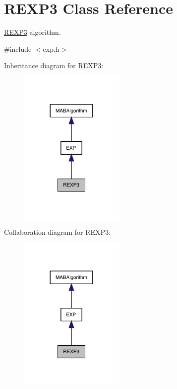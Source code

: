 \hypertarget{class_r_e_x_p3}{}\section{R\+E\+X\+P3 Class Reference}
\label{class_r_e_x_p3}


\mbox{\hyperlink{class_r_e_x_p3}{R\+E\+X\+P3}} algorithm.  




{\ttfamily \#include $<$exp.\+h$>$}



Inheritance diagram for R\+E\+X\+P3\+:
\nopagebreak
\begin{figure}[H]
\begin{center}
\leavevmode
\includegraphics[width=144pt]{class_r_e_x_p3__inherit__graph}
\end{center}
\end{figure}


Collaboration diagram for R\+E\+X\+P3\+:
\nopagebreak
\begin{figure}[H]
\begin{center}
\leavevmode
\includegraphics[width=144pt]{class_r_e_x_p3__coll__graph}
\end{center}
\end{figure}
